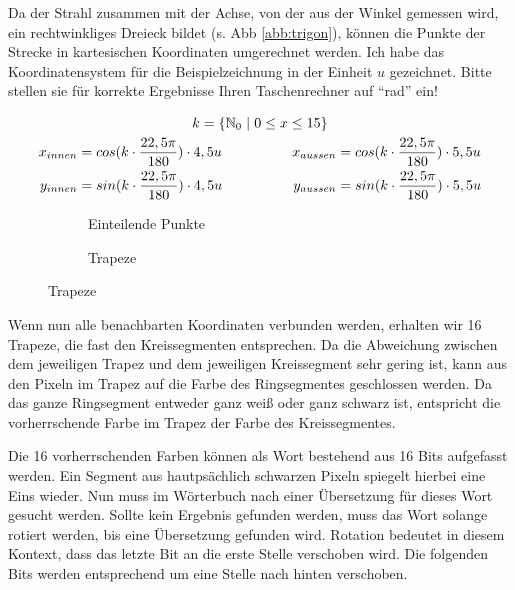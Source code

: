 	Da der Strahl zusammen mit der Achse, von der aus der Winkel gemessen wird, ein rechtwinkliges Dreieck bildet (s. Abb \ref{abb:trigon}), können die Punkte der Strecke in kartesischen Koordinaten umgerechnet werden. Ich habe das Koordinatensystem für die Beispielzeichnung in der Einheit \(u\) gezeichnet. Bitte stellen sie für korrekte Ergebnisse Ihren Taschenrechner auf "`rad"' ein!

	\begin{gather}
	k = \{\mathbb{N}_0 \hspace{0.3em}|\hspace{0.3em} 0 \le x \le 15\} \\
	\begin{split}
	x_{innen} &= cos(k \cdot \frac{22,5\pi}{180}) \cdot 4,5u \\
	y_{innen} &= sin(k \cdot \frac{22,5\pi}{180}) \cdot 4,5u
	\end{split}
	\hspace{5em}
	\begin{split}
	x_{aussen} &= cos(k \cdot \frac{22,5\pi}{180}) \cdot 5,5u \\
	y_{aussen} &= sin(k \cdot \frac{22,5\pi}{180}) \cdot 5,5u
	\end{split}
	\end{gather}

	\begin{figure}[!ht]
		\begin{subfigure}[b]{0.5\textwidth}
			\centering	
			
			\caption{Einteilende Punkte}
		\end{subfigure}
		\begin{subfigure}[b]{0.5\textwidth}
			\centering	
			
			\caption{Trapeze}
		\end{subfigure}
	\end{figure}

	Wenn nun alle benachbarten Koordinaten verbunden werden, erhalten wir 16 Trapeze, die fast den Kreissegmenten entsprechen. Da die Abweichung zwischen dem jeweiligen Trapez und dem jeweiligen Kreissegment sehr gering ist, kann aus den Pixeln im Trapez auf die Farbe des Ringsegmentes geschlossen werden. Da das ganze Ringsegment entweder ganz weiß oder ganz schwarz ist, entspricht die vorherrschende Farbe im Trapez der Farbe des Kreissegmentes.

Die 16 vorherrschenden Farben können als Wort bestehend aus 16 Bits aufgefasst werden. Ein Segment aus hautpsächlich schwarzen Pixeln spiegelt hierbei eine Eins wieder. Nun muss im Wörterbuch nach einer Übersetzung für dieses Wort gesucht werden. Sollte kein Ergebnis gefunden werden, muss das Wort solange rotiert werden, bis eine Übersetzung gefunden wird. Rotation bedeutet in diesem Kontext, dass das letzte Bit an die erste Stelle verschoben wird. Die folgenden Bits werden entsprechend um eine Stelle nach hinten verschoben.
